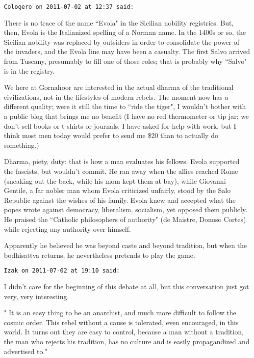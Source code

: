 \begin{footnotesize}
\begin{sffamily}
\hfill

\texttt{Cologero on 2011-07-02 at 12:37 said: }

There is no trace of the name ``Evola" in the Sicilian nobility registries. But, then, Evola is the Italianized spelling of a Norman name. In the 1400s or so, the Sicilian nobility was replaced by outsiders in order to consolidate the power of the invaders, and the Evola line may have been a casualty. The first Salvo arrived from Tuscany, presumably to fill one of those roles; that is probably why ``Salvo" is in the registry.

We here at Gornahoor are interested in the actual dharma of the traditional civilizations, not in the lifestyles of modern rebels. The moment now has a different quality; were it still the time to ``ride the tiger", I wouldn't bother with a public blog that brings me no benefit (I have no red thermometer or tip jar; we don't sell books or t-shirts or journals. I have asked for help with work, but I think most men today would prefer to send me \$20 than to actually do something.)

Dharma, piety, duty: that is how a man evaluates his fellows. Evola supported the fascists, but wouldn't commit. He ran away when the allies reached Rome (sneaking out the back, while his mom kept them at bay), while Giovanni Gentile, a far nobler man whom Evola criticized unfairly, stood by the Salo Republic against the wishes of his family. Evola knew and accepted what the popes wrote against democracy, liberalism, socialism, yet opposed them publicly. He praised the ``Catholic philosophers of authority" (de Maistre, Donoso Cortes) while rejecting any authority over himself.

Apparently he believed he was beyond caste and beyond tradition, but when the bodhisattva returns, he nevertheless pretends to play the game.


\hfill

\texttt{Izak on 2011-07-02 at 19:10 said: }

I didn't care for the beginning of this debate at all, but this conversation just got very, very interesting. 

" It is an easy thing to be an anarchist, and much more difficult to follow the cosmic order. This rebel without a cause is tolerated, even encouraged, in this world. It turns out they are easy to control, because a man without a tradition, the man who rejects his tradition, has no culture and is easily propagandized and advertised to."


\end{sffamily}
\end{footnotesize}

